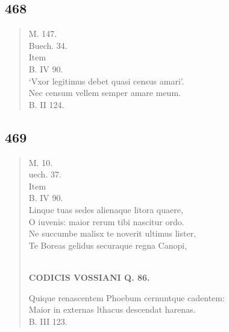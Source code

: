 \documentclass[11pt, a4paper]{report}
\begin{document}
            \subsection*{468}
      \begin{verse}
      M. 147. \\ Buech. 34. \\  \lbrack Item \rbrack  \\ B. IV 90. \\ ‘Vxor legitimus debet quasi census amari’. \\ Nec censum vellem semper amare meum. \\ B. II 124. \\ 
      \end{verse}
  
            \subsection*{469}
      \begin{verse}
      M. 10. \\ uech. 37. \\ Item \\ B. IV 90. \\ Linque tuas sedes alienaque litora quaere, \\  \lbrack O \rbrack  iuvenis: maior rerum tibi nascitur ordo. \\ Ne succumbe malisx te noverit ultimus lister, \\ Te Boreas gelidus securaque regna Canopi, \\ 
        ﻿\pagebreak 
    \begin{center} \textbf{CODICIS VOSSIANI Q. 86.} \end{center} \marginpar{[345]} Quique renascentem Phoebum cernuntque cadentem: \\ Maior in externas lthacus descendat harenas. \\ B. III 123. \\ 
      \end{verse}
  
\end{document}
